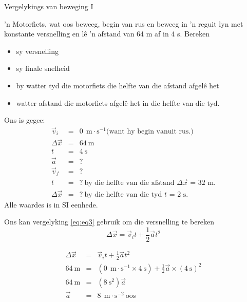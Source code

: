       \noindent
\begin{wex}{Vergelykings van beweging I}
{'n Motorfiets, wat oos beweeg, begin van rus en beweeg in 'n reguit lyn met konstante versnelling en l\^e 'n afstand van 64 m af in 4 s. Bereken
\begin{itemize}
    \item sy versnelling
    \item sy finale snelheid
    \item by watter tyd die motorfiets die helfte van die afstand afgel\^e het
    \item watter afstand die motorfiets afgel\^e het in die helfte van die tyd.
\end{itemize}}
{
Ons is gegee:
\begin{eqnarray*}
\vec{v}_i&=&0\ ~\text{m}\cdot \text{s}^{-1} \mbox{(want hy begin vanuit rus.)}\\
\Delta \vec{x}&=&64\ \text{m}\\
t&=&4\ \text{s}\\
\vec{a}&=&?\\
\vec{v}_f&=&?\\
t&=&?\ \mbox{by die helfte van die afstand $\Delta \vec{x}$~=~32~m.}\\
\Delta \vec{x}&=&?\ \mbox{by die helfte van die tyd $t$~=~2~s.}
\end{eqnarray*}
Alle waardes is in  SI eenhede.

Ons kan vergelyking \ref{eq:eq3} gebruik om die versnelling te bereken
\begin{displaymath}
\Delta \vec{x} = \vec{v}_it +\frac{1}{2}\vec{a}t^2
\end{displaymath}

\begin{eqnarray*}
\Delta \vec{x} &=& \vec{v}_it +\frac{1}{2}\vec{a}t^2\\
64\ \text{m} &=& (0\ ~\text{m}\cdot \text{s}^{-1} \times 4\ \text{s}) + \frac{1}{2} \vec{a} \times (4\ \text{s})^2\\
64\ \text{m} &=& (8\ \text{s}^2) \vec{a}\\
\vec{a} &=&8\ ~\text{m}\cdot \text{s}^{-2}~\text{oos}
\end{eqnarray*}

}
\end{wex}
